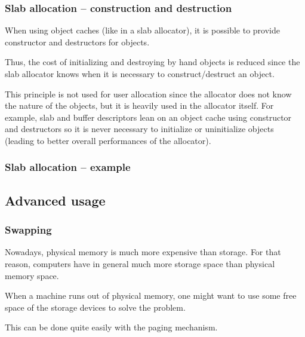 \begin{frame}
  \frametitle{Slab allocation -- construction and destruction}

  When using object caches (like in a slab allocator), it is possible
  to provide constructor and destructors for objects.

  \-

  Thus, the cost of initializing and destroying by hand objects is
  reduced since the slab allocator knows when it is necessary to
  construct/destruct an object.

  \-

  This principle is not used for user allocation since the allocator
  does not know the nature of the objects, but it is heavily used in
  the allocator itself. For example, slab and buffer descriptors lean
  on an object cache using constructor and destructors so it is never
  necessary to initialize or uninitialize objects (leading to better
  overall performances of the allocator).

\end{frame}

\begin{frame}
  \frametitle{Slab allocation -- example}

  \begin{center}
  \end{center}

\end{frame}


\subsection{Advanced usage}

\begin{frame}
  \frametitle{Swapping}

  Nowadays, physical memory is much more expensive than storage. For that reason, computers have in general much more storage space than physical memory space.

  \-

  When a machine runs out of physical memory, one might want to use some free space of the storage devices to solve the problem.

  \-

  This can be done quite easily with the paging mechanism.

\end{frame}

